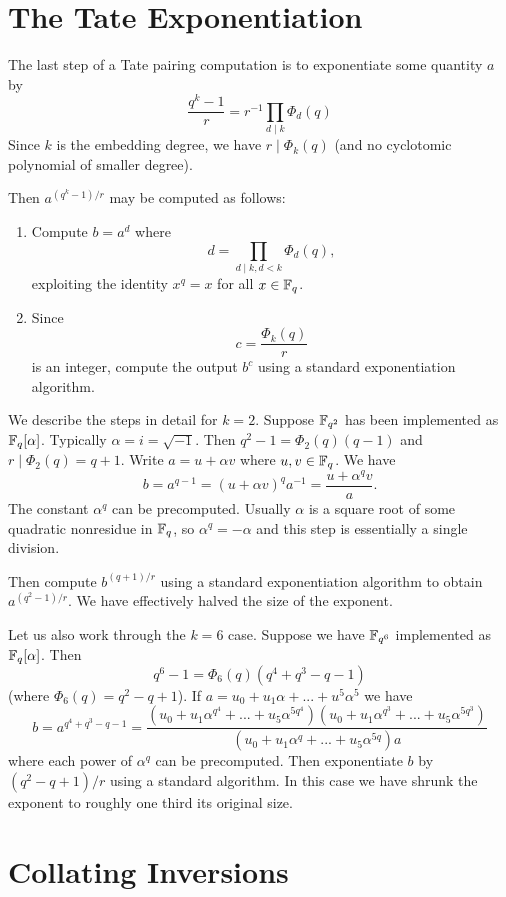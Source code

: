 \section {The Tate Exponentiation}

The last step of a Tate pairing computation is
to exponentiate some quantity $a$ by
\[ \frac{q^k-1}{r} = r^{-1} \prod_{d\mid k} \Phi_d(q) \]
Since $k$ is the embedding degree, we have $r \mid \Phi_k(q)$ (and no
cyclotomic polynomial of smaller degree).

Then $a^{(q^k-1)/r}$ may be computed as follows:
\begin{enumerate}
\item
Compute $b = a^d $ where
\[ d = \prod_{d\mid k, d<k} \Phi_d(q) , \]
exploiting the identity $x^q = x$ for all $x \in \mathbb{F}_q$.
\item
Since
\[ c = \frac{\Phi_k(q)}{r} \]
is an integer, compute the output $b^c$
using a standard exponentiation algorithm.
\end{enumerate}

We describe the steps in detail
for $k = 2$. Suppose $\mathbb{F}_{q^2}$ has been implemented
as $\mathbb{F}_q[\alpha]$. Typically $\alpha = i = \sqrt{-1}$.
Then $q^2 - 1 = \Phi_2(q)(q-1)$ and
$r \mid \Phi_2(q) = q + 1$. Write $a = u + \alpha v$ where $u,v \in \mathbb{F}_q$.
We have
\[ b = a^{q-1} = (u + \alpha v)^q a^{-1} = \frac{u + \alpha^q v}{a} .\]
The constant $\alpha^q$ can be precomputed. Usually $\alpha$ is a square root
of some quadratic nonresidue in $\mathbb{F}_q$, so $\alpha^q = -\alpha$ and
this step is essentially a single division.

Then compute $b^{(q+1)/r}$ using a standard exponentiation algorithm
to obtain $a^{(q^2-1)/r}$. We have effectively halved the size of the exponent.

Let us also work through the $k = 6$ case. Suppose we have $\mathbb{F}_{q^6}$
implemented as $\mathbb{F}_q[\alpha]$. Then
\[ q^6 - 1 = \Phi_6(q) (q^4 + q^3 - q - 1)\]
(where $\Phi_6(q) = q^2 - q + 1$).
If $a = u_0 + u_1 \alpha + ... + u^5 \alpha^5$ we have
\[ b =
a^{q^4 + q^3 - q - 1}
= \frac{
(u_0 + u_1 \alpha^{q^4} + ... + u_5 \alpha^{5q^4})
(u_0 + u_1 \alpha^{q^3} + ... + u_5 \alpha^{5q^3})}
{
(u_0 + u_1 \alpha^q + ... + u_5 \alpha^{5q})a
}
\]
where each power of $\alpha^q$ can be precomputed. Then exponentiate $b$
by $(q^2 - q + 1)/r$ using a standard algorithm.
In this case we have shrunk the exponent to roughly one third its original
size.

\section {Collating Inversions}

